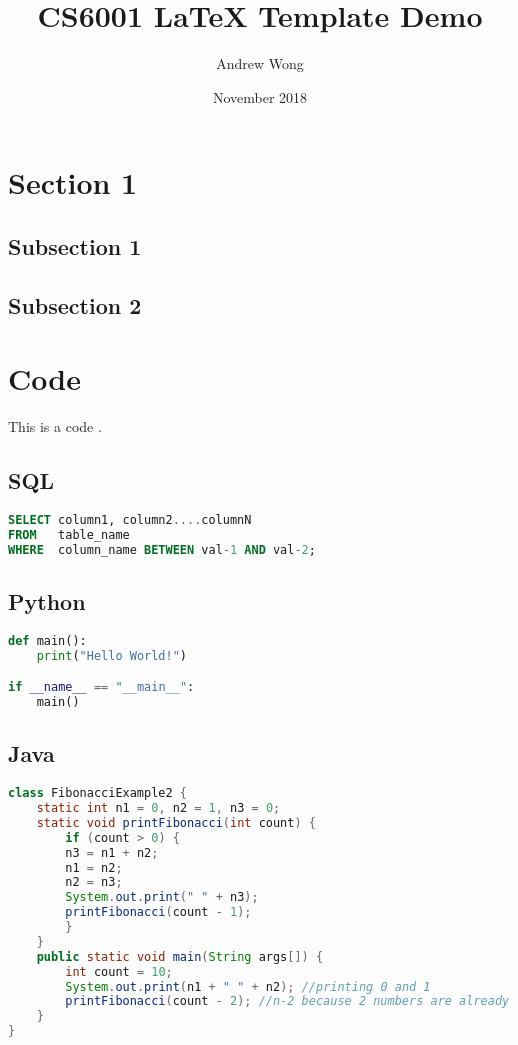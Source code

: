 \documentclass{stacs_cw}
\begin{document}
\title{CS6001 LaTeX Template Demo}
\author{Andrew Wong}
\date{November 2018}
\maketitle
\tableofcontents
\newpage
\section{Section 1}
\subsection{Subsection 1}

\subsection{Subsection 2}

\section{Code}
This is a code .

\subsection{SQL}

\begin{lstlisting}[language=sql]
SELECT column1, column2....columnN
FROM   table_name
WHERE  column_name BETWEEN val-1 AND val-2;
\end{lstlisting}

\subsection{Python}
\begin{lstlisting}[language=python]
def main():
	print("Hello World!")

if __name__ == "__main__":
	main()
\end{lstlisting}

\subsection{Java}
\begin{lstlisting}[language=Java]
class FibonacciExample2 {
	static int n1 = 0, n2 = 1, n3 = 0;
	static void printFibonacci(int count) {
		if (count > 0) {
		n3 = n1 + n2;
		n1 = n2;
		n2 = n3;
		System.out.print(" " + n3);
		printFibonacci(count - 1);
		}
	}
	public static void main(String args[]) {
		int count = 10;
		System.out.print(n1 + " " + n2); //printing 0 and 1    
		printFibonacci(count - 2); //n-2 because 2 numbers are already printed   
	}
}
\end{lstlisting}
\end{document}

